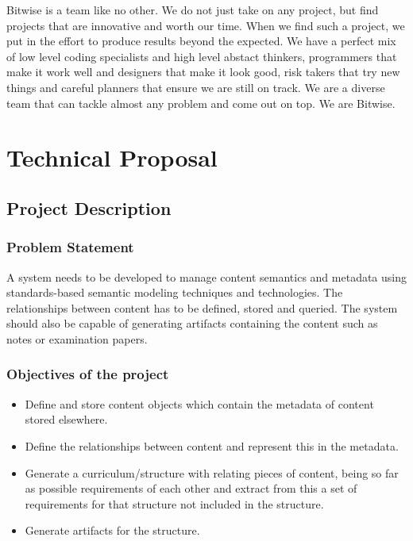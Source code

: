 \documentclass[a4paper]{article}
\begin{document}
Bitwise is a team like no other. We do not just take on any project, but find projects that are innovative and worth our time. When we find such a project, we put in the effort to produce results beyond the expected. We have a perfect mix of low level coding specialists and high level abstact thinkers, programmers that make it work well and designers that make it look good, risk takers that try new things and careful planners that ensure we are still on track. We are a diverse team that can tackle almost any problem and come out on top. We are Bitwise.

	\section{Technical Proposal}

		\subsection{Project Description}

			\subsubsection{Problem Statement}

A system needs to be developed to manage content semantics and metadata using standards-based semantic modeling techniques and technologies. The relationships between content has to be defined, stored and queried. The system should also be capable of generating artifacts containing the content such as notes or examination papers.

			\subsubsection{Objectives of the project}

				\begin{itemize}

					\item Define and store content objects which contain the metadata of content stored elsewhere.

					\item Define the relationships between content and represent this in the metadata.

					\item Generate a curriculum/structure with relating pieces of content, being so far as possible requirements of each other and extract from this a set of requirements for that structure not included in the structure.
                    
                    \item Generate artifacts for the structure.

				\end{itemize}
\end{document}
